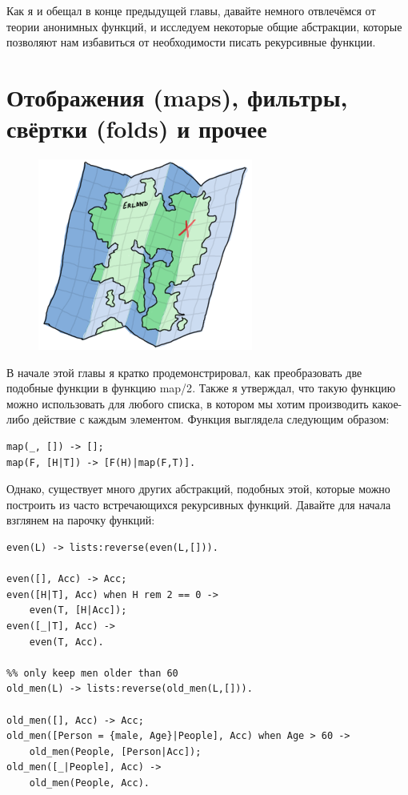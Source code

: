 \documentclass[a4paper,12pt]{report}
\newcommand{\ops}{\colorbox{lgreen}}
\begin{document}
Как я и обещал в конце предыдущей главы, давайте немного отвлечёмся от теории анонимных функций, и исследуем некоторые общие абстракции, которые позволяют нам избавиться от необходимости писать рекурсивные функции.
\section{Отображения (maps), фильтры, свёртки (folds) и прочее}
\label{maps_filters_folds_and_more}
\begin{figure}
    \includegraphics[width=1\linewidth]{erland.png}
\end{figure}
В начале этой главы я кратко продемонстрировал, как преобразовать две подобные функции в функцию \ops{map/2}. Также я утверждал, что такую функцию можно использовать для любого списка, в котором мы хотим производить какое\--либо действие с каждым элементом. Функция выглядела следующим образом:
\begin{lstlisting}[style=erlang]
map(_, []) -> [];
map(F, [H|T]) -> [F(H)|map(F,T)].
\end{lstlisting}
Однако, существует много других абстракций, подобных этой, которые можно построить из часто встречающихся рекурсивных функций. Давайте для начала взглянем на парочку функций:
\begin{lstlisting}[style=erlang]
%% only keep even numbers
even(L) -> lists:reverse(even(L,[])).
 
even([], Acc) -> Acc;
even([H|T], Acc) when H rem 2 == 0 ->
    even(T, [H|Acc]);
even([_|T], Acc) ->
    even(T, Acc).
 
%% only keep men older than 60
old_men(L) -> lists:reverse(old_men(L,[])).
 
old_men([], Acc) -> Acc;
old_men([Person = {male, Age}|People], Acc) when Age > 60 ->
    old_men(People, [Person|Acc]);
old_men([_|People], Acc) ->
    old_men(People, Acc).
\end{lstlisting}
\end{document}
